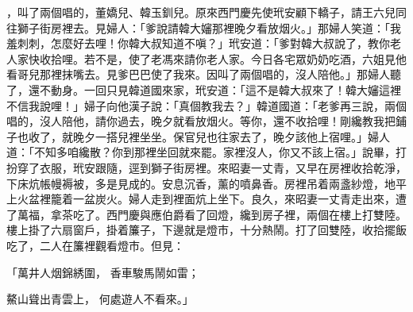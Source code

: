 \begin{showcontents}{}
，叫了兩個唱的，董嬌兒、韓玉釧兒。原來西門慶先使玳安顧下轎子，請王六兒同往獅子街房裡去。見婦人：「爹說請韓大嬸那裡晚夕看放烟火。」那婦人笑道：「我羞刺刺，怎麼好去哩！你韓大叔知道不嗔？」玳安道：「爹對韓大叔說了，教你老人家快收拾哩。若不是，使了老馮來請你老人家。今日各宅眾奶奶吃酒，六姐見他看哥兒那裡抹嘴去。見爹巴巴使了我來。因叫了兩個唱的，沒人陪他。」那婦人聽了，還不動身。一回只見韓道國來家，玳安道：「這不是韓大叔來了！韓大嬸這裡不信我說哩！」婦子向他漢子說：「真個教我去？」韓道國道：「老爹再三說，兩個唱的，沒人陪他，請你過去，晚夕就看放烟火。等你，還不收拾哩！剛纔教我把鋪子也收了，就晚夕一搭兒裡坐坐。保官兒也往家去了，晚夕該他上宿哩。」婦人道：「不知多咱纔散？你到那裡坐回就來罷。家裡沒人，你又不該上宿。」說畢，打扮穿了衣服，玳安跟隨，逕到獅子街房裡。來昭妻一丈青，又早在房裡收拾乾淨，下床炕帳幔褥被，多是見成的。安息沉香，薰的噴鼻香。房裡吊着兩盞紗燈，地平上火盆裡籠着一盆炭火。婦人走到裡面炕上坐下。良久，來昭妻一丈青走出來，遭了萬福，拿茶吃了。西門慶與應伯爵看了回燈，纔到房子裡，兩個在樓上打雙陸。樓上掛了六扇窗戶，掛着簾子，下邊就是燈市，十分熱鬧。打了回雙陸，收拾擺飯吃了，二人在簾裡觀看燈市。但見：

「萬井人烟錦綉圍，  香車駿馬鬧如雷；

鰲山聳出青雲上，  何處遊人不看來。」


\end{showcontents}
